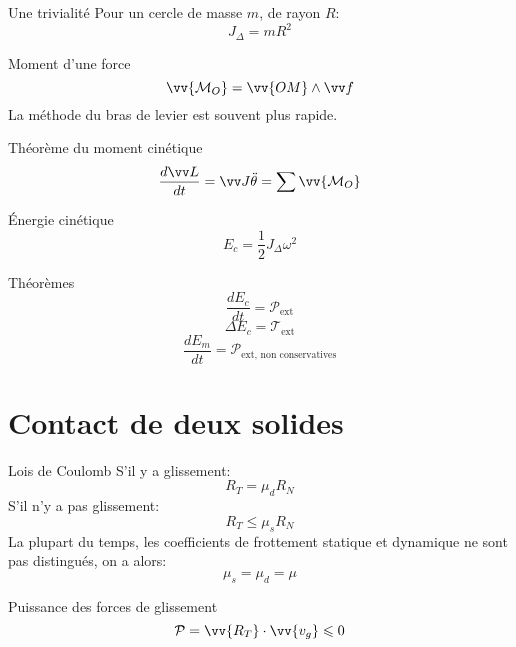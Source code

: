 \documentclass[french, a4paper, 11pt, twocolumn]{article}
\begin{document}
\begin{cadre}{Une trivialité}
  Pour un cercle de masse \(m\), de rayon \(R\):
  \[J_{\Delta} = mR^{2}\]
\end{cadre}

\begin{cadre}{Moment d'une force}
  \[\vv{\mathcal M_{O}} = \vv{OM}\wedge \vv f\]
  La méthode du bras de levier est souvent plus rapide.
\end{cadre}

\begin{cadre}{Théorème du moment cinétique}
  \[\dfrac{d\vv L}{dt}=\vv J\ddot\theta=\sum\vv{\mathcal M_{O}}\]
\end{cadre}

\begin{cadre}{Énergie cinétique}
  \[E_{c} = \dfrac{1}{2}J_{\Delta}\omega^{2}\]
\end{cadre}

\begin{cadre}{Théorèmes}
  \[\dfrac{dE_{c}}{dt}=\mathcal P_{\mathrm{ext}}\]
  \[\Delta E_{c}=\mathcal T_{\mathrm{ext}}\]
  \[\dfrac{dE_{m}}{dt}=\mathcal P_{\text{ext, non conservatives}}\]
\end{cadre}

\section{Contact de deux solides}
\begin{cadre}{Lois de Coulomb}
  S'il y a glissement:
  \[R_{T} = \mu_{d}R_{N}\]
  S'il n'y a pas glissement:
  \[R_{T} \leqslant \mu_{s}R_{N}\]
  La plupart du temps, les coefficients de frottement statique et dynamique ne sont pas distingués, on a alors:
  \[\mu_{s} = \mu_{d} = \mu\]
\end{cadre}

\begin{cadre}{Puissance des forces de glissement}
  \[\mathcal P = \vv{R_{T}}\cdot\vv{v_{g}}\leqslant 0\]
\end{cadre}
\end{document}
